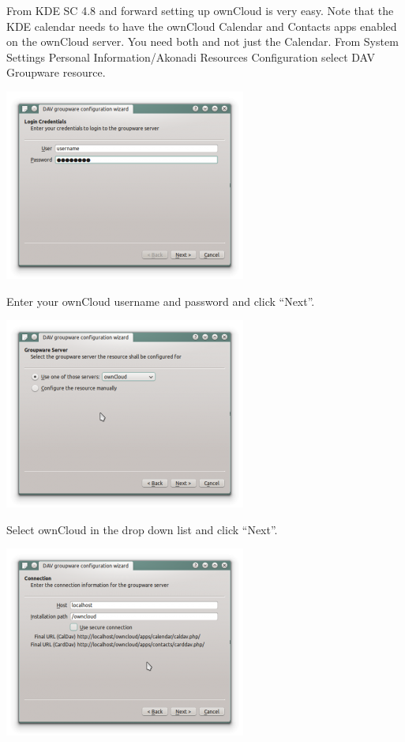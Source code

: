 \documentclass[letterpaper,10pt,english]{sphinxmanual}
\begin{document}
From KDE SC 4.8 and forward setting up ownCloud is very easy. Note that the KDE
calendar needs to have the ownCloud Calendar and Contacts apps enabled on the
ownCloud server. You need both and not just the Calendar. From System Settings
Personal Information/Akonadi Resources Configuration select DAV Groupware
resource.

\includegraphics{kdes2.png}

Enter your ownCloud username and password and click ``Next''.

\includegraphics{kdes3.png}

Select ownCloud in the drop down list and click ``Next''.

\includegraphics{kdes4.png}
\end{document}
